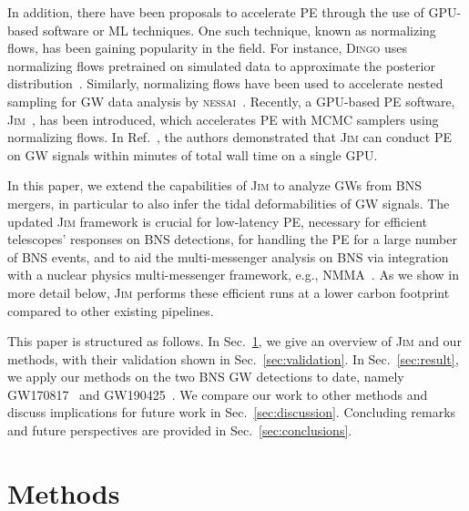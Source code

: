 \documentclass[prd,twocolumn,a4paper,floatfix,nofootinbib,preprintnumbers,superscriptaddress]{revtex4-1}
\begin{document}
In addition, there have been proposals to accelerate \ac{PE} through the use of \ac{GPU}-based software or \ac{ML} techniques. One such technique, known as normalizing flows, has been gaining popularity in the field. For instance, \textsc{Dingo} uses normalizing flows pretrained on simulated data to approximate the posterior distribution~\cite{Dax:2021tsq, Dax:2022pxd,Bhardwaj:2023xph}. Similarly, normalizing flows have been used to accelerate nested sampling for \ac{GW} data analysis by \textsc{nessai}~\cite{Williams:2021qyt, Williams:2023ppp}. Recently, a \ac{GPU}-based \ac{PE} software, \textsc{Jim}~\cite{Wong:2023lgb}, has been introduced, which accelerates \ac{PE} with \ac{MCMC} samplers using normalizing flows. In Ref.~\cite{Wong:2023lgb}, the authors demonstrated that \textsc{Jim} can conduct \ac{PE} on \ac{GW} signals within minutes of total wall time on a single \ac{GPU}. 

In this paper, we extend the capabilities of \textsc{Jim} to analyze \acp{GW} from \ac{BNS} mergers, in particular to also infer the tidal deformabilities of \ac{GW} signals. The updated \textsc{Jim} framework is crucial for low-latency \ac{PE}, necessary for efficient telescopes' responses on \ac{BNS} detections, for handling the \ac{PE} for a large number of \ac{BNS} events, and to aid the multi-messenger analysis on \ac{BNS} via integration with a nuclear physics multi-messenger framework, e.g., \textsc{NMMA}~\cite{Pang:2022rzc}. As we show in more detail below, \textsc{Jim} performs these efficient runs at a lower carbon footprint compared to other existing pipelines.

This paper is structured as follows. In Sec.~\ref{sec:methods}, we give an overview of \textsc{Jim} and our methods, with their validation shown in Sec.~\ref{sec:validation}. In Sec.~\ref{sec:result}, we apply our methods on the two \ac{BNS} \ac{GW} detections to date, namely GW170817~\cite{LIGOScientific:2017vwq} and GW190425~\cite{LIGOScientific:2020aai}. We compare our work to other methods and discuss implications for future work in Sec.~\ref{sec:discussion}. Concluding remarks and future perspectives are provided in  Sec.~\ref{sec:conclusions}.

\section{Methods} \label{sec:methods}
\end{document}
